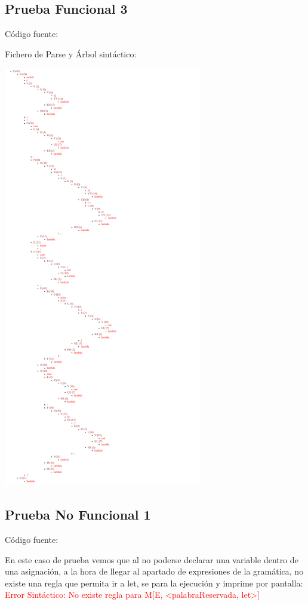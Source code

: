 \documentclass{article}[a4paper]
\newcommand\tab[1][1cm]{\hspace*{#1}}
\begin{document}
\begin{appendices}
\subsection{Prueba Funcional 3}
Código fuente:

\hspace{\parindent} Fichero de Parse y Árbol sintáctico:

\includegraphics[width=0.65\textwidth]{arbol3.png}

\subsection{Prueba No Funcional 1}
Código fuente:

En este caso de prueba vemos que al no poderse declarar una variable dentro de una asignación, a la hora de llegar al apartado de expresiones de la gramática, no existe una regla que permita ir a let, se para la ejecución y imprime por pantalla:\\
\tab \textcolor{red}{Error Sintáctico: No existe regla para M[E, <palabraReservada, let>]}


\end{appendices}
\end{document}
